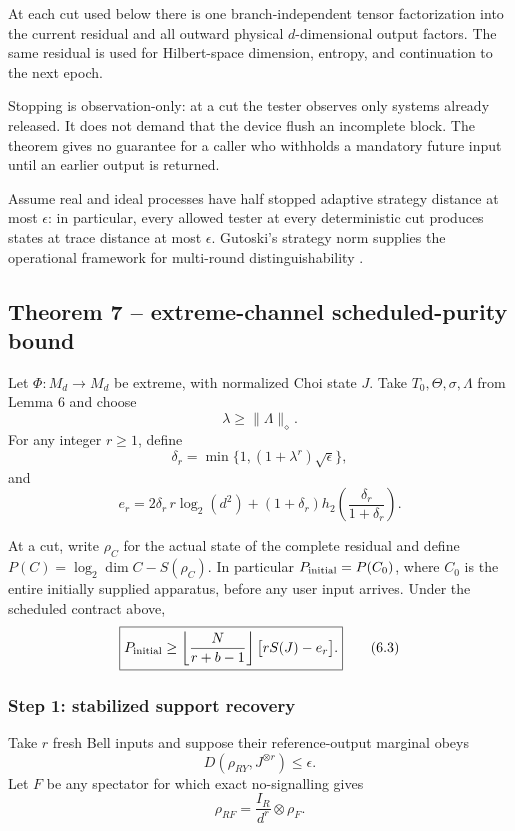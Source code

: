 \documentclass[11pt,a4paper]{article}
\numberwithin{equation}{section}
\begin{document}
At each cut used below there is one branch-independent tensor
factorization into the current residual and all outward physical
\(d\)-dimensional output factors. The same residual is used for
Hilbert-space dimension, entropy, and continuation to the next epoch.

Stopping is observation-only: at a cut the tester observes only systems
already released. It does not demand that the device flush an incomplete
block. The theorem gives no guarantee for a caller who withholds a
mandatory future input until an earlier output is returned.

Assume real and ideal processes have half stopped adaptive strategy
distance at most \(\epsilon\): in particular, every allowed tester at
every deterministic cut produces states at trace distance at most
\(\epsilon\). Gutoski's strategy norm supplies the operational framework
for multi-round distinguishability \citep{gutoski2012}.

\subsection*{Theorem 7 -- extreme-channel scheduled-purity
bound}\label{theorem-7-extreme-channel-scheduled-purity-bound}

Let \(\Phi:M_d\to M_d\) be extreme, with normalized Choi state \(J\).
Take \(T_0,\Theta,\sigma,\Lambda\) from Lemma 6 and choose \[
\lambda\ge\|\Lambda\|_\diamond.
\] For any integer \(r\ge1\), define \[
\delta_r
=
\min\{1,(1+\lambda^r)\sqrt\epsilon\},
\tag{6.1}
\] and \[
e_r
=
2\delta_r\,r\log_2(d^2)
+
(1+\delta_r)
h_2\!\left(
\frac{\delta_r}{1+\delta_r}
\right).
\tag{6.2}
\]

At a cut, write \(\rho_C\) for the actual state of the complete residual
and define \(P(C)=\log_2\dim C-S(\rho_C)\). In particular
\(P_{\rm initial}=P(C_0)\), where \(C_0\) is the entire initially
supplied apparatus, before any user input arrives. Under the scheduled
contract above, \[
\boxed{
P_{\rm initial}
\ge
\left\lfloor
\frac{N}{r+b-1}
\right\rfloor
\bigl[rS(J)-e_r\bigr].
}
\tag{6.3}
\]

\subsubsection{Step 1: stabilized support
recovery}\label{step-1-stabilized-support-recovery}

Take \(r\) fresh Bell inputs and suppose their reference-output marginal
obeys \[
D(\rho_{RY},J^{\otimes r})\le\epsilon.
\tag{6.4}
\] Let \(F\) be any spectator for which exact no-signalling gives \[
\rho_{RF}
=
\frac{I_R}{d^r}\otimes\rho_F.
\tag{6.5}
\]
\end{document}
